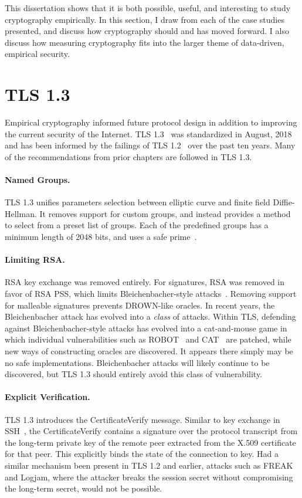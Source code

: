 This dissertation shows that it is both possible, useful, and interesting to
study cryptography empirically. In this section, I draw from each of the case
studies presented, and discuss how cryptography should and has moved
forward. I also discuss how measuring cryptography fits into the larger theme
of data-driven, empirical security.

\section{TLS 1.3}

Empirical cryptography informed future protocol design in addition to
improving the current security of the Internet. TLS 1.3~\cite{rfc8446} was
standardized in August, 2018 and has been informed by the failings of TLS
1.2~\cite{tls-ietf-inria-bug,tls-ietf-smacktls,tls-ietf-rsa-pss} over the
past ten years. Many of the recommendations from prior chapters are followed
in TLS 1.3.

\paragraph{Named Groups.}
TLS 1.3 unifies parameters selection between elliptic curve and finite field
Diffie-Hellman. It removes support for custom \dhe{} groups, and instead
provides a method to select from a preset list of groups. Each of the
predefined groups has a minimum length of 2048 bits, and uses a safe
prime~\cite{rfc7919}.

\paragraph{Limiting RSA.}
RSA key exchange was removed entirely. For signatures, RSA \PKCS was removed
in favor of RSA PSS, which limits Bleichenbacher-style
attacks~\cite{exact-security-rsa}. Removing support for malleable \PKCS
signatures prevents DROWN-like oracles. In recent years, the Bleichenbacher
attack has evolved into a \textit{class} of attacks. Within TLS, defending
against Bleichenbacher-style attacks has evolved into a cat-and-mouse game in
which individual vulnerabilities such as ROBOT~\cite{robot-2018} and
CAT~\cite{cat-2018} are patched, while new ways of constructing oracles are
discovered. It appears there simply may be no safe \PKCS implementations.
Bleichenbacher attacks will likely continue to be discovered, but TLS 1.3
should entirely avoid this class of vulnerability.

\paragraph{Explicit Verification.}
TLS 1.3 introduces the \textsf{CertificateVerify} message. Similar to key
exchange in SSH~\cite{rfc4253}, the \textsf{CertificateVerify} contains a
signature over the protocol transcript from the long-term private key of the
remote peer extracted from the X.509 certificate for that peer. This
explicitly binds the state of the connection to key. Had a similar mechanism
been present in TLS 1.2 and earlier, attacks such as FREAK and Logjam, where
the attacker breaks the session secret without compromising the long-term
secret, would not be possible.

